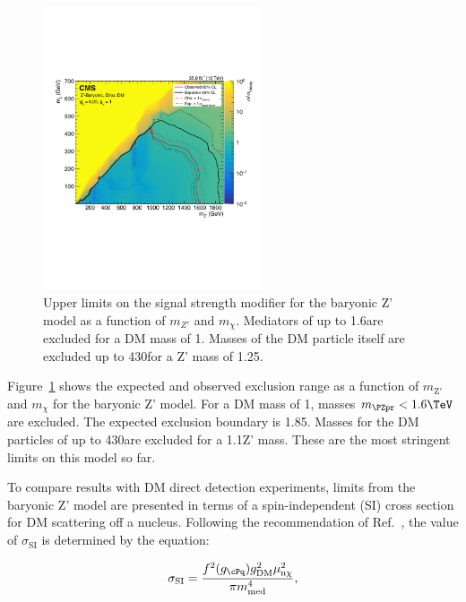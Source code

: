 \begin{figure}[htbp]
  \centering
  \includegraphics[width=0.575\textwidth]{figures/limits/limit2d_zpb_monohbb_.pdf}
  \caption{Upper limits on the signal strength modifier for the baryonic Z' model  as a function of $m_{Z'}$ and $m_\chi$. Mediators of up to 1.6\TeV are excluded for a DM mass of 1\GeV. Masses of the DM particle itself are excluded up to 430\GeV for a Z' mass of 1.25\TeV.}
  \label{fig:limits}
\end{figure}




Figure~\ref{fig:limits} shows the expected and observed exclusion range as a function of $m_{\text{Z}'}$ and $m_{\chi}$ for the baryonic Z' model. For a DM mass of 1\GeV, masses $\mzp<1.6\TeV$ are excluded. The expected exclusion boundary is 1.85\TeV. Masses for the DM particles of up to 430\GeV are excluded for a 1.1\TeV Z' mass. These are the most stringent limits on this model so far. %

To compare results with DM direct detection experiments, limits from the baryonic Z' model are presented in terms of a spin-independent (SI) cross section \SigSI for DM scattering off a nucleus.
Following the recommendation of Ref.~\cite{presentDM}, the value of $\sigma_\text{SI}$ is determined by the equation:

\begin{equation}
\sigma_\text{SI} = \frac{f^2(g_{\cPq})g^2_{\mathrm{DM}}\mu^2_{\mathrm{n}\chi}}{\pi m^4_{\mathrm{med}}},
\end{equation}

